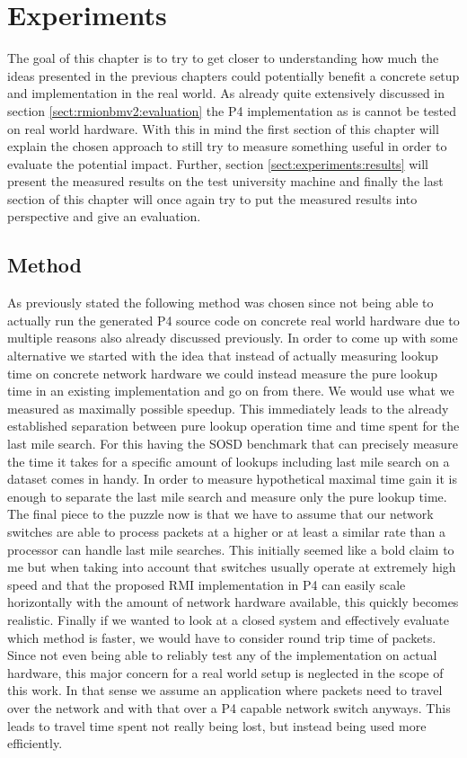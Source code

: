 
\chapter{Experiments}
\label{ch:experiments}
The goal of this chapter is to try to get closer to understanding how much the ideas presented in the previous chapters could potentially benefit a concrete setup and implementation in the real world. As already quite extensively discussed in section \ref{sect:rmionbmv2:evaluation} the P4 implementation as is cannot be tested on real world hardware. With this in mind the first section of this chapter will explain the chosen approach to still try to measure something useful in order to evaluate the potential impact. Further, section \ref{sect:experiments:results} will present the measured results on the test university machine and finally the last section of this chapter will once again try to put the measured results into perspective and give an evaluation.

\section{Method}
\label{sect:experiments:methods}
As previously stated the following method was chosen since not being able to actually run the generated P4 source code on concrete real world hardware due to multiple reasons also already discussed previously. In order to come up with some alternative we started with the idea that instead of actually measuring lookup time on concrete network hardware we could instead measure the pure lookup time in an existing implementation and go on from there. We would use what we measured as maximally possible speedup. This immediately leads to the already established separation between pure lookup operation time and time spent for the last mile search. For this having the SOSD benchmark that can precisely measure the time it takes for a specific amount of lookups including last mile search on a dataset comes in handy. In order to measure hypothetical maximal time gain it is enough to separate the last mile search and measure only the pure lookup time. The final piece to the puzzle now is that we have to assume that our network switches are able to process packets at a higher or at least a similar rate than a processor can handle last mile searches. This initially seemed like a bold claim to me but when taking into account that switches usually operate at extremely high speed and that the proposed RMI implementation in P4 can easily scale horizontally with the amount of network hardware available, this quickly becomes realistic. Finally if we wanted to look at a closed system and effectively evaluate which method is faster, we would have to consider round trip time of packets. Since not even being able to reliably test any of the implementation on actual hardware, this major concern for a real world setup is neglected in the scope of this work. In that sense we assume an application where packets need to travel over the network and with that over a P4 capable network switch anyways. This leads to travel time spent not really being lost, but instead being used more efficiently.

